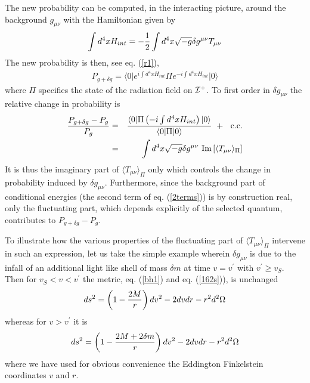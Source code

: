 \documentclass[12pt]{article}
\begin{document}
The new probability can be computed, in the interacting picture,
around the background $g_{\mu\nu}$ with the Hamiltonian given by
\begin{equation}
\int d^4x H_{int} = -{1\over 2} \int d^4x \sqrt{-g} \delta g^{\mu\nu}
T_{\mu\nu}
\label{backreact}
\end{equation}
The new probability is then, see eq. (\ref{r1}),
\begin{eqnarray}
P_{g+\delta g}
= \langle 0 \vert
e^{i\int d^4x H_{int}}
\Pi
e^{-i\int d^4x H_{int}}
 \vert 0 \rangle
\label{rr1}
\end{eqnarray}
where $\Pi$ specifies the state of the radiation field on ${\cal I}^+$.
To first order in $\delta g_{\mu\nu}$
 the relative change in
probability is
\begin{eqnarray}
{
P_{g+\delta g}  -P_{g}  \over P_{g} }
&=& {
\langle  0 \vert \Pi
\left( -i\int d^4x H_{int}\right)
 \vert 0 \rangle
\over \langle 0 \vert  \Pi \vert 0 \rangle } \ +\ \mbox{ c.c.}\nonumber\\
&=&
\int d^4x \sqrt{-g} \delta g^{\mu\nu}
\mbox{ Im} \left[ \langle T_{\mu\nu} \rangle_{\Pi} \right]
\label{rr2}
\end{eqnarray}
It is thus the imaginary part of $\langle T_{\mu\nu} \rangle_{\Pi}$
only which controls the change in probability induced by $\delta g_{\mu\nu}$.
Furthermore, since the background part of conditional energies (the second
term of eq. (\ref{2terms})) is by construction real, only the fluctuating
part, which depends explicitly of the selected quantum,
 contributes to $P_{g+\delta g}  -P_{g}$.

To illustrate how the various properties of
the fluctuating part of $\langle T_{\mu\nu} \rangle_{\Pi}$ intervene
in such an expression, let us take
the simple example wherein $\delta g_{\mu\nu}$ is due to the infall of an
additional
light like shell of mass $\delta m$ at time $v=v^\prime$ with $v^\prime
\geq v_S$. Then for $v_S<v<v^\prime$ the metric, eq. (\ref{bh1}) and eq.
(\ref{162s})), is unchanged
\begin{equation}
ds^2 = \left( 1 -{2M\over r}\right) dv^2 -2dvdr -r^2 d^2\Omega
\label{rr3}\end{equation}
whereas for $v>v^\prime$ it is
\begin{equation}
ds^2 = \left( 1 -{2M+ 2\delta m \over r}\right) dv^2 -2dvdr -r^2 d^2\Omega
\label{rr4}\end{equation}
where we have used for obvious convenience the Eddington Finkelstein
 coordinates $v$ and $r$.
\end{document}
